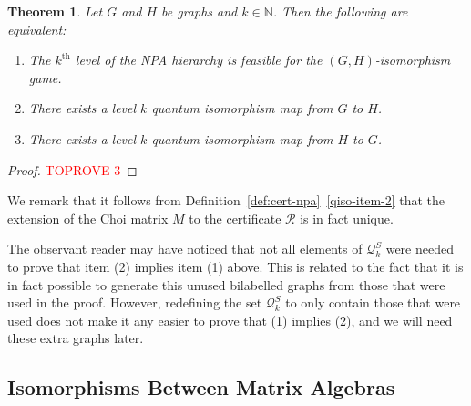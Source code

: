 \documentclass[11pt,a4paper]{article}
\theoremstyle{plain}
\newtheorem{thm}{Theorem}[section]
\theoremstyle{remark}
\theoremstyle{definition}
\begin{document}
\begin{thm}\label{thm:main-theorem-1}
    Let $G$ and $H$ be graphs and $k \in \mathbb{N}$. Then the following are equivalent:
    \begin{enumerate}
        \item The $k^\text{th}$ level of the NPA hierarchy is feasible for the $(G,H)$-isomorphism game.
        \item There exists a level $k$ quantum isomorphism map from $G$ to $H$.
        \item There exists a level $k$ quantum isomorphism map from $H$ to $G$.
    \end{enumerate}
\end{thm}
\begin{proof}\textcolor{red}{TOPROVE 3}\end{proof}

We remark that it follows from Definition~\ref{def:cert-npa}~\ref{qiso-item-2} that the extension of the Choi matrix $M$ to the certificate $\mathcal{R}$ is in fact unique.

The observant reader may have noticed that not all elements of $\mathcal{Q}_k^S$ were needed to prove that item (2) implies item (1) above. This is related to the fact that it is in fact possible to generate this unused bilabelled graphs from those that were used in the proof. However, redefining the set $\mathcal{Q}_k^S$ to only contain those that were used does not make it any easier to prove that (1) implies (2), and we will need these extra graphs later.






































\subsection{Isomorphisms Between Matrix Algebras}
\end{document}
